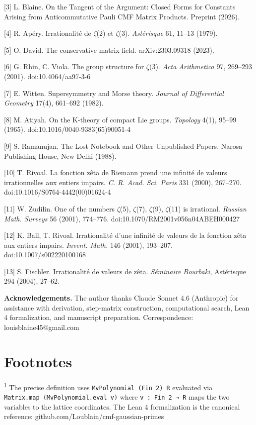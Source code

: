 \documentclass[11pt]{article}
\begin{document}
{[}3{]} L. Blaine. On the Tangent of the Argument: Closed Forms for
Constants Arising from Anticommutative Pauli CMF Matrix Products.
Preprint (2026).

{[}4{]} R. Apéry. Irrationalité de \(\zeta\)(2) et \(\zeta\)(3).
\emph{Astérisque} 61, 11--13 (1979).

{[}5{]} O. David. The conservative matrix field. arXiv:2303.09318
(2023).

{[}6{]} G. Rhin, C. Viola. The group structure for \(\zeta\)(3).
\emph{Acta Arithmetica} 97, 269--293 (2001). doi:10.4064/aa97-3-6

{[}7{]} E. Witten. Supersymmetry and Morse theory. \emph{Journal of
Differential Geometry} 17(4), 661--692 (1982).

{[}8{]} M. Atiyah. On the K-theory of compact Lie groups.
\emph{Topology} 4(1), 95--99 (1965). doi:10.1016/0040-9383(65)90051-4

{[}9{]} S. Ramanujan. The Lost Notebook and Other Unpublished Papers.
Narosa Publishing House, New Delhi (1988).

{[}10{]} T. Rivoal. La fonction zêta de Riemann prend une infinité de
valeurs irrationnelles aux entiers impairs. \emph{C. R. Acad. Sci.
Paris} 331 (2000), 267--270. doi:10.1016/S0764-4442(00)01624-4

{[}11{]} W. Zudilin. One of the numbers \(\zeta\)(5), \(\zeta\)(7),
\(\zeta\)(9), \(\zeta\)(11) is irrational. \emph{Russian Math. Surveys}
56 (2001), 774--776. doi:10.1070/RM2001v056n04ABEH000427

{[}12{]} K. Ball, T. Rivoal. Irrationalité d'une infinité de valeurs de
la fonction zêta aux entiers impairs. \emph{Invent. Math.} 146 (2001),
193--207. doi:10.1007/s002220100168

{[}13{]} S. Fischler. Irrationalité de valeurs de zêta. \emph{Séminaire
Bourbaki}, Astérisque 294 (2004), 27--62.

\textbf{Acknowledgements.} The author thanks Claude Sonnet 4.6
(Anthropic) for assistance with derivation, step-matrix construction,
computational search, Lean 4 formalization, and manuscript preparation.
Correspondence: louisblaine45@gmail.com

\hypertarget{footnotes}{%
\section{Footnotes}\label{footnotes}}

\textsuperscript{1} The precise definition uses
\texttt{MvPolynomial\ (Fin\ 2)\ R} evaluated via
\texttt{Matrix.map\ (MvPolynomial.eval\ v)} where
\texttt{v\ :\ Fin\ 2\ →\ R} maps the two variables to the lattice
coordinates. The Lean 4 formalization is the canonical reference:
github.com/Loublain/cmf-gaussian-primes
\end{document}
